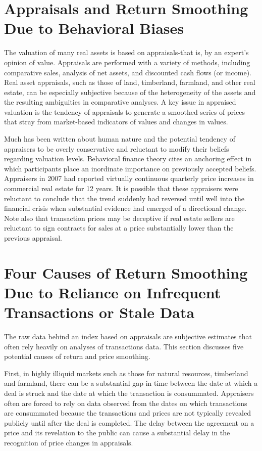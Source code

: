 \documentclass[11pt]{article}
\begin{document}
\section*{Appraisals and Return Smoothing Due to Behavioral Biases}
The valuation of many real assets is based on appraisals-that is, by an expert's opinion of value. Appraisals are performed with a variety of methods, including comparative sales, analysis of net assets, and discounted cash flows (or income). Real asset appraisals, such as those of land, timberland, farmland, and other real estate, can be especially subjective because of the heterogeneity of the assets and the resulting ambiguities in comparative analyses. A key issue in appraised valuation is the tendency of appraisals to generate a smoothed series of prices that stray from market-based indicators of values and changes in values.

Much has been written about human nature and the potential tendency of appraisers to be overly conservative and reluctant to modify their beliefs regarding valuation levels. Behavioral finance theory cites an anchoring effect in which participants place an inordinate importance on previously accepted beliefs. Appraisers in 2007 had reported virtually continuous quarterly price increases in commercial real estate for 12 years. It is possible that these appraisers were reluctant to conclude that the trend suddenly had reversed until well into the financial crisis when substantial evidence had emerged of a directional change. Note also that transaction prices may be deceptive if real estate sellers are reluctant to sign contracts for sales at a price substantially lower than the previous appraisal.

\section*{Four Causes of Return Smoothing Due to Reliance on Infrequent Transactions or Stale Data}
The raw data behind an index based on appraisals are subjective estimates that often rely heavily on analyses of transactions data. This section discusses five potential causes of return and price smoothing.

First, in highly illiquid markets such as those for natural resources, timberland and farmland, there can be a substantial gap in time between the date at which a deal is struck and the date at which the transaction is consummated. Appraisers often are forced to rely on data observed from the dates on which transactions are consummated because the transactions and prices are not typically revealed publicly until after the deal is completed. The delay between the agreement on a price and its revelation to the public can cause a substantial delay in the recognition of price changes in appraisals.
\end{document}
